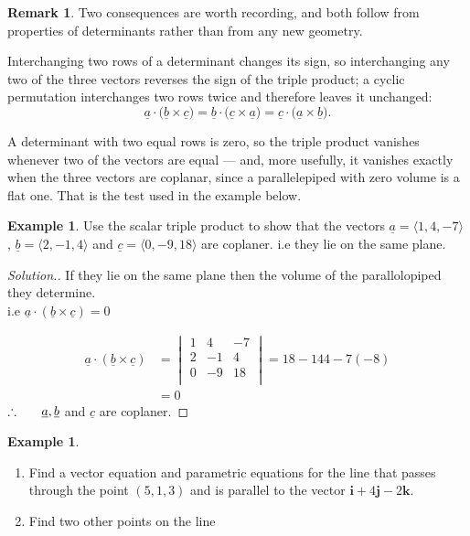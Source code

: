 \documentclass[11pt,a4paper]{article}
\theoremstyle{definition}
\newtheorem{exa}[thm]{Example}
\newtheorem*{remark}{Remark}
\newenvironment{solution}
  {\renewcommand{\qedsymbol}{}\begin{proof}[\textit{Solution}.]}
  {\end{proof}}
\begin{document}
\begin{remark}
Two consequences are worth recording, and both follow from properties of
determinants rather than from any new geometry.

Interchanging two rows of a determinant changes its sign, so interchanging any
two of the three vectors reverses the sign of the triple product; a cyclic
permutation interchanges two rows twice and therefore leaves it unchanged:
$$\underline{a}\cdot\big(\underline{b}\times\underline{c}\big)
= \underline{b}\cdot\big(\underline{c}\times\underline{a}\big)
= \underline{c}\cdot\big(\underline{a}\times\underline{b}\big).$$

A determinant with two equal rows is zero, so the triple product vanishes
whenever two of the vectors are equal --- and, more usefully, it vanishes exactly
when the three vectors are coplanar, since a parallelepiped with zero volume is
a flat one. That is the test used in the example below.
\end{remark}


\begin{exa}


Use the scalar triple product to show that the vectors $\underline{a} = \langle 1 , 4, -7\rangle$ , $\underline{b} = \langle 2, -1, 4\rangle$ and $\underline{c} = \langle 0,-9,18\rangle$ are coplaner. i.e they lie on the same plane.
\end{exa}


\begin{solution}


If they lie on the same plane then the volume of the parallolopiped they determine.\\ i.e $\underline{a} \cdot (\underline{b}\times \underline{c}) = 0$

\begin{align*}
\underline{a} \cdot (\underline{b}\times \underline{c}) & = \begin{vmatrix}
1 & 4 & -7\\
2 & -1 & 4\\
0 & -9 & 18\\
\end{vmatrix} = 18 - 144 -7(-8)\\
& = 0
\end{align*}
$\therefore\hspace{0.6cm} \underline{a}, \underline{b}$ and $\underline{c}$ are coplaner.
\end{solution}


\begin{exa}
\begin{enumerate}
\item Find a vector equation and parametric equations for the line that passes through the point $(5,1,3)$ and is parallel to the vector $\textbf{i} + 4\textbf{j} - 2\textbf{k}$.
\item Find two other points on the line
\end{enumerate}
\end{exa}
\end{document}

